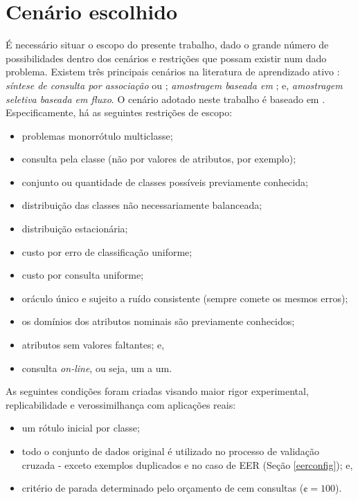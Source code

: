 \section{Cenário escolhido}\label{desccen}
É necessário situar o escopo do presente trabalho, dado o grande número de possibilidades dentro dos cenários e restrições que possam existir num dado problema.
Existem três principais cenários na literatura de aprendizado ativo
\cite{settles2010active}:
\textit{síntese de consulta por associação} ou
;
\textit{amostragem baseada em \pool}; e,
\textit{amostragem seletiva baseada em fluxo}.
O cenário adotado neste trabalho é baseado em \pool.
Especificamente, há as seguintes restrições de escopo:
\begin{itemize}
 \item problemas monorrótulo multiclasse;
 \item consulta pela classe (não por valores de atributos, por exemplo);
 \item conjunto ou quantidade de classes possíveis previamente conhecida;
 \item distribuição das classes não necessariamente balanceada;
 \item distribuição estacionária;
 \item custo por erro de classificação uniforme;
 \item custo por consulta uniforme;
 \item oráculo único e sujeito a ruído consistente (sempre comete os mesmos erros);
 \item os domínios dos atributos nominais são previamente conhecidos;
 \item atributos sem valores faltantes; e,
 \item consulta \textit{on-line}, ou seja, um a um.
\end{itemize}
As seguintes condições foram criadas visando maior rigor experimental, replicabilidade e verossimilhança com aplicações reais:
\begin{itemize}
 \item um rótulo inicial por classe;
 \item todo o conjunto de dados original é utilizado no processo de validação cruzada - exceto exemplos duplicados e no caso de EER (Seção \ref{eerconfig}); e,
 \item critério de parada determinado pelo orçamento de cem consultas ($\cent=100$).
 \end{itemize}

